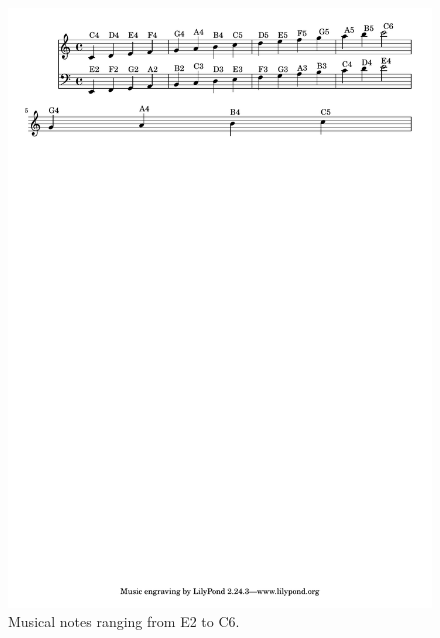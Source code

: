 \documentclass[11pt]{article}
\theoremstyle{definition}
\begin{document}
\begin{figure}
\centering
\includegraphics[trim=1cm 25cm 0cm 0.02cm, clip, scale=0.8]{pitchesonstaff.pdf} %
\caption{Musical notes ranging from E2 to C6.}
\label{fig:musical note} 
\end{figure}
\end{document}
